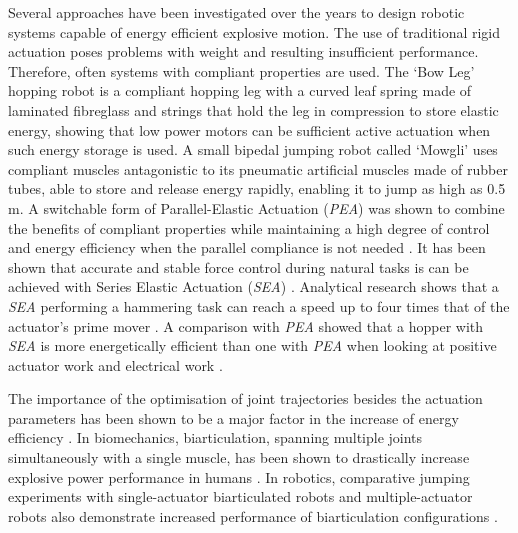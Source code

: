 \documentclass[letterpaper, 10 pt, conference]{ieeeconf}  %
\begin{document}
Several approaches have been investigated over the years to design robotic systems capable of energy efficient explosive motion. The use of traditional rigid actuation poses problems with weight and resulting insufficient performance. Therefore, often systems with compliant properties are used. The `Bow Leg' hopping robot \cite{zeglin1999bow} is a compliant hopping leg with a curved leaf spring made of laminated fibreglass and strings that hold the leg in compression to store elastic energy, showing that low power motors can be sufficient active actuation when such energy storage is used. A small bipedal jumping robot called `Mowgli' \cite{niiyama2007mowgli} uses compliant muscles antagonistic to its pneumatic artificial muscles made of rubber tubes, able to store and release energy rapidly, enabling it to jump as high as 0.5\,m. A switchable form of Parallel-Elastic Actuation (\textit{PEA}) was shown to combine the benefits of compliant properties while maintaining a high degree of control and energy efficiency when the parallel compliance is not needed \cite{liu2015spear}. It has been shown that accurate and stable force control during natural tasks is can be achieved with Series Elastic Actuation (\textit{SEA}) \cite{pratt1995series}. Analytical research shows that a \textit{SEA} performing a hammering task can reach a speed up to four times that of the actuator’s prime mover \cite{garabini2011optimality}. A comparison with \textit{PEA} showed that a hopper with \textit{SEA} is more energetically efficient than one with \textit{PEA} when looking at positive actuator work and electrical work \cite{yesilevskiy2015comparison}.

The importance of the optimisation of joint trajectories besides the actuation parameters has been shown to be a major factor in the increase of energy efficiency \cite{velasco2013soft}. In biomechanics, biarticulation, spanning multiple joints simultaneously with a single muscle, has been shown to drastically increase explosive power performance in humans \cite{schenau1989rotation,prilutsky1994tendon}. In robotics, comparative jumping experiments with single-actuator biarticulated robots and multiple-actuator robots also demonstrate increased performance of biarticulation configurations \cite{oshima2007jumping,babivc2009biarticulated,hyon2002development}.
\end{document}

